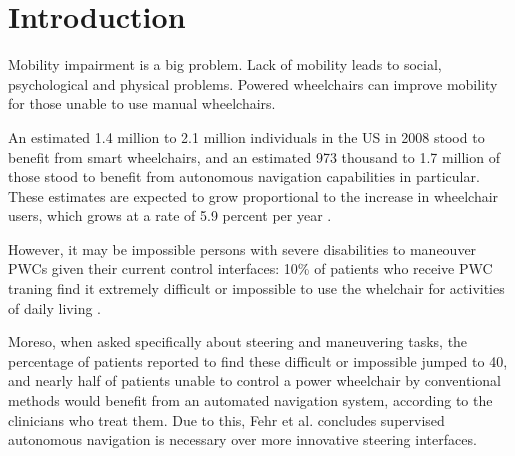 

\chapter{Introduction}
\label{ch:Introduction}






Mobility impairment is a big problem.
Lack of mobility leads to social, psychological and physical problems.
Powered wheelchairs can improve mobility for those unable to use manual wheelchairs.

An estimated 1.4 million to 2.1 million individuals in the US in 2008 stood to
benefit from smart wheelchairs, and an estimated 973 thousand to 1.7 million of
those stood to benefit from autonomous navigation capabilities in particular.
These estimates are expected to grow proportional to the increase in
wheelchair users, which grows at a rate of 5.9 percent per year
\cite{simpson2008many}.

However, it may be impossible persons with severe disabilities to maneouver PWCs
given their current control interfaces: 10\% of patients who receive PWC traning
find it extremely difficult or impossible to use the whelchair for activities of
daily living \cite{fehr2000adequacy}.

Moreso, when asked specifically about steering and maneuvering tasks, the
percentage of patients reported to find these difficult or impossible jumped to
40, and  nearly half of patients unable to control a power wheelchair by
conventional methods would benefit from an automated navigation system,
according to the clinicians who treat them. 
Due to this, Fehr et al. \cite{fehr2000adequacy} concludes supervised autonomous
navigation is necessary over more innovative steering interfaces.

